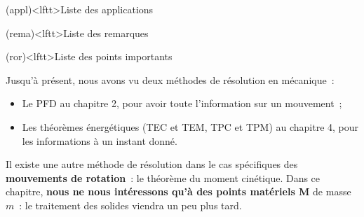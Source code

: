 \documentclass[../../main/main.tex]{subfiles}
\begin{document}
\begin{boxes}
	\begin{tcb}(appl)<lftt>{Liste des applications}
	\end{tcb}
	\begin{tcb}(rema)<lftt>{Liste des remarques}
	\end{tcb}
	\begin{tcb}(ror)<lftt>{Liste des points importants}
	\end{tcb}
\end{boxes}
\vspace*{\fill}
\newpage

Jusqu'à présent, nous avons vu deux méthodes de résolution en mécanique~:
\begin{itemize}
	\item Le PFD au chapitre 2, pour avoir toute l'information sur un
	      mouvement~;
	\item Les théorèmes énergétiques (TEC et TEM, TPC et TPM) au chapitre 4,
	      pour les informations à un instant donné.
\end{itemize}
Il existe une autre méthode de résolution dans le cas spécifiques des
\textbf{mouvements de rotation}~: le théorème du moment cinétique. Dans ce
chapitre, \textbf{nous ne nous intéressons qu'à des points matériels M} de masse
$m$~: le traitement des solides viendra un peu plus tard.
\end{document}
